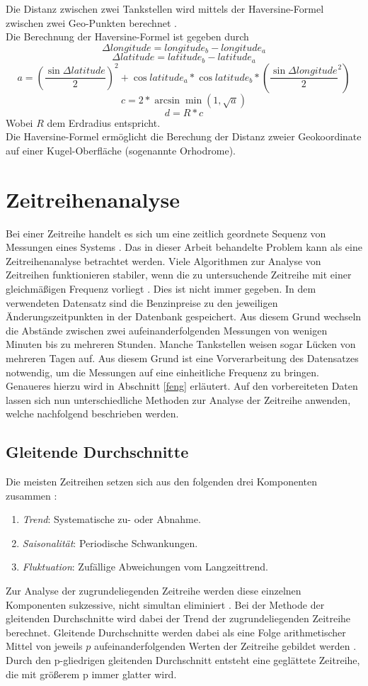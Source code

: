 \documentclass[
ngerman          %
,a4paper          %
,11pt
,pdftex
]{report}
\begin{document}
Die Distanz zwischen zwei Tankstellen wird mittels der Haversine-Formel zwischen zwei Geo-Punkten berechnet \cite{haversine}.\\
Die Berechnung der Haversine-Formel ist gegeben durch
$$ \Delta longitude = longitude_b - longitude_a $$
$$ \Delta latitude = latitude_b - latitude_a $$
$$ a = (\frac{\sin \Delta latitude}{2})^2 + \cos latitude_a * \cos latitude_b * (\frac{\sin \Delta longitude}{2}^2)$$
$$ c = 2 * \arcsin \min(1,\sqrt{a})$$
$$ d = R * c $$
Wobei $R$ dem Erdradius entspricht.\\
Die Haversine-Formel ermöglicht die Berechung der Distanz zweier Geokoordinate auf einer Kugel-Oberfläche (sogenannte Orhodrome).
\section{Zeitreihenanalyse}
Bei einer Zeitreihe handelt es sich um eine zeitlich geordnete Sequenz von Messungen eines Systems \cite[145]{thinkstats}. Das in dieser Arbeit behandelte Problem kann als eine Zeitreihenanalyse betrachtet werden. Viele Algorithmen zur Analyse von Zeitreihen funktionieren stabiler, wenn die zu untersuchende Zeitreihe mit einer gleichmäßigen Frequenz vorliegt \cite[146]{thinkstats}. Dies ist nicht immer gegeben. In dem verwendeten Datensatz sind die Benzinpreise zu den jeweiligen Änderungszeitpunkten in der Datenbank gespeichert. Aus diesem Grund wechseln die Abstände zwischen zwei aufeinanderfolgenden Messungen von wenigen Minuten bis zu mehreren Stunden. Manche Tankstellen weisen sogar Lücken von mehreren Tagen auf. Aus diesem Grund ist eine Vorverarbeitung des Datensatzes notwendig, um die Messungen auf eine einheitliche Frequenz zu bringen. Genaueres hierzu wird in Abschnitt \ref{feng} erläutert. Auf den vorbereiteten Daten lassen sich nun unterschiedliche Methoden zur Analyse der Zeitreihe anwenden, welche nachfolgend beschrieben werden.

\subsection{Gleitende Durchschnitte}
Die meisten Zeitreihen setzen sich aus den folgenden drei Komponenten zusammen \cite[151]{thinkstats}:

\begin{enumerate}
	\item \textit{Trend}: Systematische zu- oder Abnahme.
	\item \textit{Saisonalität}: Periodische Schwankungen.
	\item \textit{Fluktuation}: Zufällige Abweichungen vom Langzeittrend.
\end{enumerate}
Zur Analyse der zugrundeliegenden Zeitreihe werden diese einzelnen Komponenten sukzessive, nicht simultan eliminiert \cite[397]{lippe}. Bei der Methode der gleitenden Durchschnitte wird dabei der Trend der zugrundeliegenden Zeitreihe berechnet. Gleitende Durchschnitte werden dabei als eine Folge arithmetischer Mittel von jeweils $p$ aufeinanderfolgenden Werten der Zeitreihe gebildet werden \cite[403]{lippe}. Durch den p-gliedrigen gleitenden Durchschnitt entsteht eine geglättete Zeitreihe, die mit größerem p immer glatter wird. 
\end{document}
